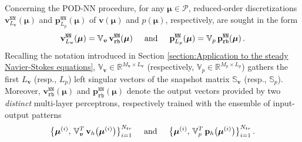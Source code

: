 \documentclass[12pt, a4paper, twoside, openright, notitlepage]{report}
\numberwithin{equation}{chapter}
\theoremstyle{theorem}
\theoremstyle{definition}
\theoremstyle{remark}
\theoremstyle{proposition}
\numberwithin{figure}{chapter}
\newcommand{\bg}[1]{\boldsymbol{#1}}
\begin{document}
		Concerning the POD-NN procedure, for any $\bg{\mu} \in \mathcal{P}$, reduced-order discretizations $\mathbf{v}_{L_{\bg{v}}}^{\texttt{NN}}(\bg{\mu})$ and $\mathbf{p}_{L_p}^{\texttt{NN}}(\bg{\mu})$ of $\bg{v}(\bg{\mu})$ and $p(\bg{\mu})$, respectively, are sought in the form
		\begin{equation*}
			\mathbf{v}_{L_{\bg{v}}}^{\texttt{NN}}(\bg{\mu}) = \mathbb{V}_{\bg{v}} \, \mathbf{v}_{\texttt{rb}}^{\texttt{NN}}(\bg{\mu}) \hspace*{0.5cm} \text{and} \hspace*{0.5cm} \mathbf{p}_{L_p}^{\texttt{NN}}(\bg{\mu}) = \mathbb{V}_{p} \, \mathbf{p}_{\texttt{rb}}^{\texttt{NN}}(\bg{\mu}) \, .
		\end{equation*}
		Recalling the notation introduced in Section \ref{section:Application to the steady Navier-Stokes equations}, $\mathbb{V}_{\bg{v}} \in \mathbb{R}^{M_{\bg{v}} \times L_{\bg{v}}}$ (respectively, $\mathbb{V}_{p} \in \mathbb{R}^{M_p \times L_p}$) gathers the first $L_{\bg{v}}$ (resp., $L_p$) left singular vectors of the snapshot matrix $\mathbb{S}_{\bg{v}}$ (resp., $\mathbb{S}_p$). Moreover, $\mathbf{v}_{\texttt{rb}}^{\texttt{NN}}(\bg{\mu})$ and $\mathbf{p}_{\texttt{rb}}^{\texttt{NN}}(\bg{\mu})$ denote the output vectors provided by two \emph{distinct} multi-layer perceptrons, respectively trained with the ensemble of input-output patterns
		\begin{equation*}
			\big\lbrace \bg{\mu}^{(i)}, \, \mathbb{V}_{\bg{v}}^T \, \mathbf{v}_h \big( \bg{\mu}^{(i)} \big) \big\rbrace_{i = 1}^{N_{tr}} \hspace*{0.5cm} \text{and} \hspace*{0.5cm} \big\lbrace \bg{\mu}^{(i)}, \, \mathbb{V}_{p}^T \, \mathbf{p}_h \big( \bg{\mu}^{(i)} \big) \big\rbrace_{i = 1}^{N_{tr}} \, .
		\end{equation*}
		
		\clearpage
		
\end{document}
